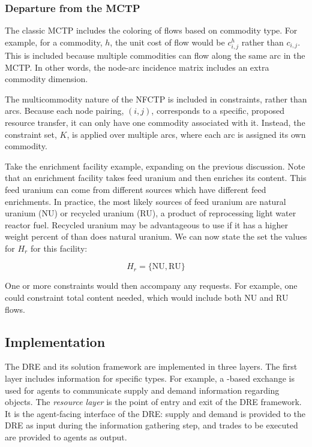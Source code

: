 \subsubsection{Departure from the MCTP}

The classic MCTP includes the coloring of flows based on commodity type. For
example, for a commodity, $h$, the unit cost of flow would be $c^h_{i,j}$ rather
than $c_{i, j}$. This is included because multiple commodities can flow along
the same arc in the MCTP. In other words, the node-arc incidence matrix includes
an extra commodity dimension. 

The multicommodity nature of the NFCTP is included in constraints, rather than
arcs. Because each node pairing, $(i, j)$, corresponds to a specific, proposed
resource transfer, it can only have one commodity associated with it. Instead,
the constraint set, $K$, is applied over multiple arcs, where each arc is
assigned its own commodity. 

Take the enrichment facility example, expanding on the previous discussion. Note
that an enrichment facility takes feed uranium and then enriches its
 content. This feed uranium can come from different sources which
have different feed enrichments. In practice, the most likely sources of feed
uranium are natural uranium (NU) or recycled uranium (RU), a product of
reprocessing light water reactor fuel. Recycled uranium may be advantageous to
use if it has a higher weight percent of  than does natural
uranium. We can now state the set the values for $H_{r}$ for this facility:

\begin{equation}\label{eqs:enr-dem-commods}
  H_{r} = \{ \mbox{NU}, \mbox{RU} \}
\end{equation}

One or more constraints would then accompany any requests. For example, one
could constraint total  content needed, which would include both NU
and RU flows.

\subsection{Implementation}\label{abm:dre:impl}

The DRE and its solution framework are implemented in three layers. The first
layer includes information for specific  types. For example, a
-based exchange is used for agents to communicate supply and
demand information regarding  objects. The \textit{resource
  layer} is the point of entry and exit of the DRE framework. It is the
agent-facing interface of the DRE: supply and demand is provided to the DRE as
input during the information gathering step, and trades to be executed are
provided to agents as output.

